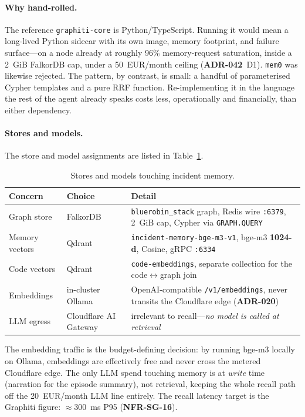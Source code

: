 \documentclass[11pt]{article}
\begin{document}
\paragraph{Why hand-rolled.}
The reference \texttt{graphiti-core} is Python/TypeScript. Running it would mean a
long-lived Python sidecar with its own image, memory footprint, and failure
surface---on a node already at roughly 96\% memory-request saturation, inside a
2~GiB FalkorDB cap, under a 50~EUR/month ceiling (\textbf{ADR-042}~D1).
\texttt{mem0} was likewise rejected. The pattern, by contrast, is small: a handful
of parameterised Cypher templates and a pure RRF function. Re-implementing it in
the language the rest of the agent already speaks costs less, operationally and
financially, than either dependency.

\paragraph{Stores and models.}
The store and model assignments are listed in Table~\ref{tab:stores}.

\begin{table}[ht]
\centering
\caption{Stores and models touching incident memory.}
\label{tab:stores}
\begin{tabular}{lll}
\toprule
Concern & Choice & Detail \\
\midrule
Graph store    & FalkorDB & \texttt{bluerobin\_stack} graph, Redis wire \texttt{:6379}, 2~GiB cap, Cypher via \texttt{GRAPH.QUERY} \\
Memory vectors & Qdrant   & \texttt{incident-memory-bge-m3-v1}, bge-m3 \textbf{1024-d}, Cosine, gRPC \texttt{:6334} \\
Code vectors   & Qdrant   & \texttt{code-embeddings}, separate collection for the code$\leftrightarrow$graph join \\
Embeddings     & in-cluster Ollama & OpenAI-compatible \texttt{/v1/embeddings}, never transits the Cloudflare edge (\textbf{ADR-020}) \\
LLM egress     & Cloudflare AI Gateway & irrelevant to recall---\emph{no model is called at retrieval} \\
\bottomrule
\end{tabular}
\end{table}

The embedding traffic is the budget-defining decision: by running bge-m3 locally
on Ollama, embeddings are effectively free and never cross the metered Cloudflare
edge. The only LLM spend touching memory is at \emph{write} time (narration for
the episode summary), not retrieval, keeping the whole recall path off the
20~EUR/month LLM line entirely. The recall latency target is the Graphiti figure:
$\approx$300~ms P95 (\textbf{NFR-SG-16}).
\end{document}
